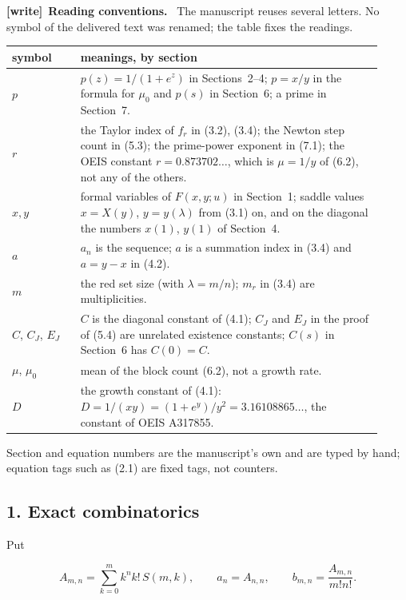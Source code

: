 \documentclass[11pt,letterpaper]{article}
\newenvironment{writenote}[1][]{\par\smallskip\begingroup\small
 \noindent\textbf{[write]}\if\relax\detokenize{#1}\relax\else~\textbf{#1.}\fi\ }%
 {\par\endgroup\smallskip}
\numberwithin{equation}{subsection}
\theoremstyle{definition}
\theoremstyle{remark}
\theoremstyle{plain}
\begin{document}
\begin{writenote}[Reading conventions]
The manuscript reuses several letters. No symbol of the delivered text was
renamed; the table fixes the readings.

\smallskip
\noindent\begin{tabular}{@{}>{\raggedright\arraybackslash}p{0.17\linewidth}
 >{\raggedright\arraybackslash}p{0.75\linewidth}@{}}
\toprule
symbol & meanings, by section \\
\midrule
$p$ & $p(z)=1/(1+e^z)$ in Sections~2--4; $p=x/y$ in the formula for $\mu_0$
 and $p(s)$ in Section~6; a prime in Section~7. \\
$r$ & the Taylor index of $f_r$ in (3.2), (3.4); the Newton step count in
 (5.3); the prime-power exponent in (7.1); the OEIS constant
 $r=0.873702\ldots$, which is $\mu=1/y$ of (6.2), not any of the others. \\
$x,y$ & formal variables of $F(x,y;u)$ in Section~1; saddle values
 $x=X(y)$, $y=y(\lambda)$ from (3.1) on, and on the diagonal the numbers
 $x(1)$, $y(1)$ of Section~4. \\
$a$ & $a_n$ is the sequence; $a$ is a summation index in (3.4) and
 $a=y-x$ in (4.2). \\
$m$ & the red set size (with $\lambda=m/n$); $m_r$ in (3.4) are
 multiplicities. \\
$C$, $C_J$, $E_J$ & $C$ is the diagonal constant of (4.1); $C_J$ and $E_J$ in
 the proof of (5.4) are unrelated existence constants; $C(s)$ in Section~6
 has $C(0)=C$. \\
$\mu$, $\mu_0$ & mean of the block count (6.2), not a growth rate. \\
$D$ & the growth constant of (4.1): $D=1/(xy)=(1+e^{y})/y^{2}
 =3.16108865\ldots$, the constant of OEIS A317855. \\
\bottomrule
\end{tabular}

\smallskip
\noindent Section and equation numbers are the manuscript's own and are
typed by hand; equation tags such as (2.1) are fixed tags, not counters.
\end{writenote}

\subsection{1. Exact combinatorics}\label{a122:exact-combinatorics}

Put

\[
 A_{m,n}=\sum_{k=0}^m k^n k!\,S(m,k),\qquad a_n=A_{n,n},\qquad
 b_{m,n}=\frac{A_{m,n}}{m!n!}.
\]
\end{document}
